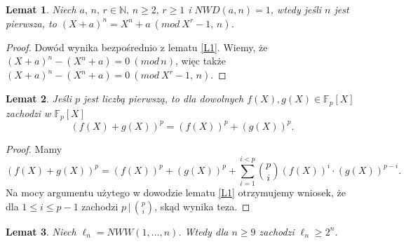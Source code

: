 \documentclass[declaration,shortabstract]{iithesis}
\theoremstyle{definition}
\theoremstyle{remark} \newtheorem{observation}{Obserwacja}
\theoremstyle{plain} \newtheorem{theorem}{Twierdzenie}
\theoremstyle{plain} \newtheorem{lemma}{Lemat}
\theoremstyle{remark} \newtheorem*{remark*}{Uwaga}
\theoremstyle{reminder} \newtheorem*{reminder*}{Przypomnienie}
\begin{document}
\begin{lemma} \label{L2}
	Niech $a,\, n, \, r \in \mathbb{N},\, n \geq 2,\, r \geq 1$ i $NWD(a, n) = 1$, wtedy jeśli $n$ jest pierwsza, to $(X + a)^n = X^n + a \: (mod \: X^r - 1,\, n)$.
\end{lemma}
	
\begin{proof}
	Dowód wynika bezpośrednio z lematu \ref{L1}. Wiemy, że $(X + a)^n - (X^n + a) = 0 \: (mod \, n)$, więc także $(X + a)^n - (X^n + a) = 0 \: (mod \: X^r - 1,\, n)$.
\end{proof}
	
\begin{lemma}\label{p_intro}
	Jeśli $p$ jest liczbą pierwszą, to dla dowolnych $f(X), g(X) \in \mathbb{F}_p[X]$ zachodzi w $\mathbb{F}_p[X]$ \[(f(X) + g(X))^p = (f(X))^p + (g(X))^p.\]
\end{lemma}
	
\begin{proof}
	Mamy \[(f(X) + g(X))^p = (f(X))^p + (g(X))^p + \sum_{i=1}^{i < p}{p \choose i}(f(X))^i\cdot(g(X))^{p - i}.\] Na mocy argumentu użytego w dowodzie lematu \ref{L1} otrzymujemy wniosek, że dla $1 \leq i \leq p - 1$ zachodzi $p \, | \, {p \choose i}$, skąd wynika teza.
\end{proof}
	
\begin{lemma} \label{3.1}
	Niech $\ell_n = NWW(1, \dots, n)$. Wtedy dla $n \geq 9$ zachodzi $\ell_n \geq 2^n$.
\end{lemma}
	
\end{document}
